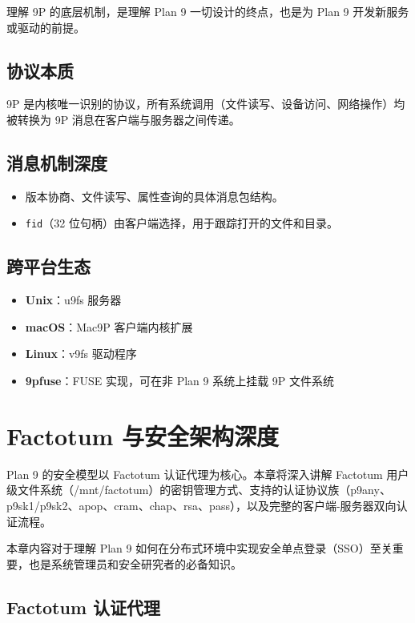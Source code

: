 \documentclass[12pt,UTF8]{ctexbook}
\begin{document}
理解 9P 的底层机制，是理解 Plan 9 一切设计的终点，也是为 Plan 9 开发新服务或驱动的前提。

\section{协议本质}

9P 是内核唯一识别的协议，所有系统调用（文件读写、设备访问、网络操作）均被转换为 9P 消息在客户端与服务器之间传递。

\section{消息机制深度}

\begin{itemize}
\item 版本协商、文件读写、属性查询的具体消息包结构。
\item \texttt{fid}（32 位句柄）由客户端选择，用于跟踪打开的文件和目录。
\end{itemize}

\section{跨平台生态}

\begin{itemize}
\item \textbf{Unix}：u9fs 服务器
\item \textbf{macOS}：Mac9P 客户端内核扩展
\item \textbf{Linux}：v9fs 驱动程序
\item \textbf{9pfuse}：FUSE 实现，可在非 Plan 9 系统上挂载 9P 文件系统
\end{itemize}

\chapter{Factotum 与安全架构深度}

Plan 9 的安全模型以 Factotum 认证代理为核心。本章将深入讲解 Factotum 用户级文件系统（/mnt/factotum）的密钥管理方式、支持的认证协议族（p9any、p9sk1/p9sk2、apop、cram、chap、rsa、pass），以及完整的客户端-服务器双向认证流程。

本章内容对于理解 Plan 9 如何在分布式环境中实现安全单点登录（SSO）至关重要，也是系统管理员和安全研究者的必备知识。

\section{Factotum 认证代理}
\end{document}
